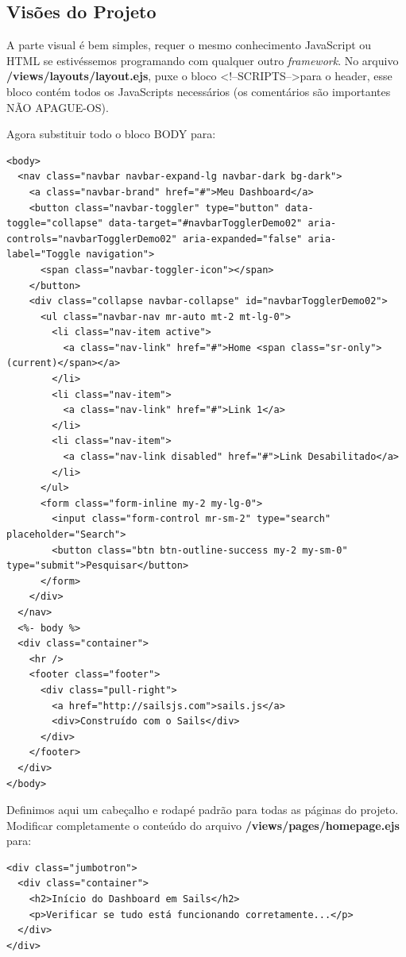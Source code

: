\documentclass[a4paper,11pt]{article}
\begin{document}
\subsection{Visões do Projeto}
A parte visual é bem simples, requer o mesmo conhecimento JavaScript ou HTML se estivéssemos programando com qualquer outro \textit{framework}. No arquivo \textbf{/views/layouts/layout.ejs}, puxe o bloco \textless!--SCRIPTS--\textgreater para o header, esse bloco contém todos os JavaScripts necessários (os comentários são importantes NÃO APAGUE-OS).

Agora substituir todo o bloco BODY para:
\begin{lstlisting}
<body>
  <nav class="navbar navbar-expand-lg navbar-dark bg-dark">
    <a class="navbar-brand" href="#">Meu Dashboard</a>
    <button class="navbar-toggler" type="button" data-toggle="collapse" data-target="#navbarTogglerDemo02" aria-controls="navbarTogglerDemo02" aria-expanded="false" aria-label="Toggle navigation">
      <span class="navbar-toggler-icon"></span>
    </button>
    <div class="collapse navbar-collapse" id="navbarTogglerDemo02">
      <ul class="navbar-nav mr-auto mt-2 mt-lg-0">
        <li class="nav-item active">
          <a class="nav-link" href="#">Home <span class="sr-only">(current)</span></a>
        </li>
        <li class="nav-item">
          <a class="nav-link" href="#">Link 1</a>
        </li>
        <li class="nav-item">
          <a class="nav-link disabled" href="#">Link Desabilitado</a>
        </li>
      </ul>
      <form class="form-inline my-2 my-lg-0">
        <input class="form-control mr-sm-2" type="search" placeholder="Search">
        <button class="btn btn-outline-success my-2 my-sm-0" type="submit">Pesquisar</button>
      </form>
    </div>      
  </nav>
  <%- body %>
  <div class="container">
    <hr />
    <footer class="footer">
      <div class="pull-right">
        <a href="http://sailsjs.com">sails.js</a>
        <div>Construído com o Sails</div>
      </div>
    </footer>
  </div>  
</body>
\end{lstlisting}

Definimos aqui um cabeçalho e rodapé padrão para todas as páginas do projeto. Modificar completamente o conteúdo do arquivo \textbf{/views/pages/homepage.ejs} para:
\begin{lstlisting}
<div class="jumbotron">
  <div class="container">
    <h2>Início do Dashboard em Sails</h2>
    <p>Verificar se tudo está funcionando corretamente...</p>
  </div>
</div>
\end{lstlisting}
\end{document}
